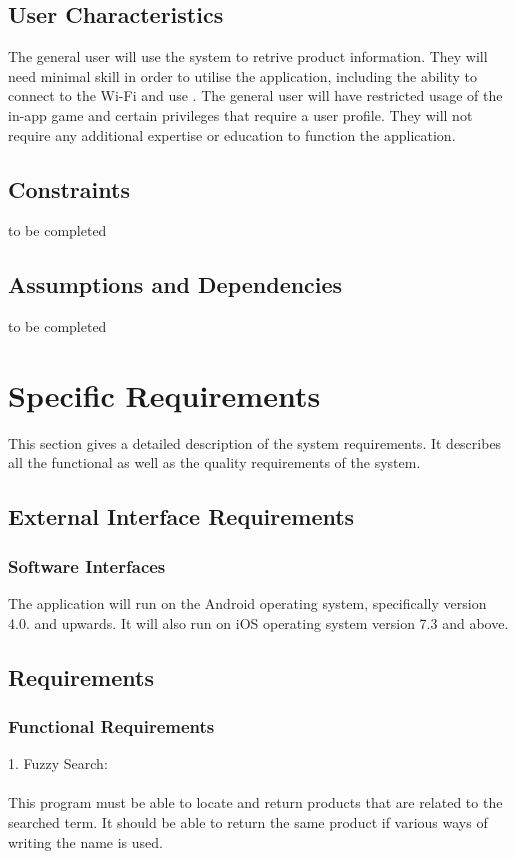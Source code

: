 \documentclass[a4paper,10pt]{article}
\begin{document}
    	\subsection{User Characteristics}  
		{ 
	
{The general user will use the system to retrive product information. They will need minimal skill in order to utilise the application, including the ability to connect to the Wi-Fi and use . The general user will have restricted usage of the in-app game and certain privileges that require a user profile. They will not require any additional expertise or education to function the application.\\}
    	\subsection{Constraints}   
to be completed
    	\subsection{Assumptions and Dependencies}
to be completed

	\newpage
		
	\section{Specific Requirements}
This section gives a detailed description of the system requirements. It describes all the functional as well as the quality requirements of the system.

	\subsection{External Interface Requirements}

                 \subsubsection{Software Interfaces}
The application will run on the Android operating system, specifically version 4.0. and upwards. It will also run on iOS operating system version 7.3 and above.

	\subsection{Requirements}
	\subsubsection{Functional Requirements} 
	1.	Fuzzy Search:\\\\
	This program must be able to locate and return products that are related to the searched term. It should be able to return the 	same product if various ways of writing the name is used.\\\\
	
}
\end{document}
